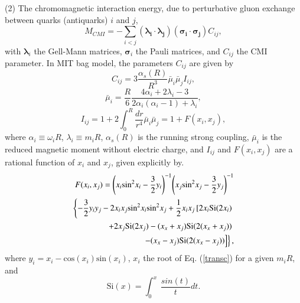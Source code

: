 \documentclass[prd,twocolumn,floatfix,nofootinbib]{revtex4}
\begin{document}
(2) The chromomagnetic interaction energy, due to perturbative gluon
exchange between quarks (antiquarks) $i$ and $j$,
\begin{equation}
M_{CMI}=-\sum_{i<j}\left( \boldsymbol{\lambda _{i}}\cdot \boldsymbol{\lambda
_{j}}\right) \left( \boldsymbol{\sigma _{i}}\cdot \boldsymbol{\sigma _{j}}%
\right) C_{ij},  \label{CMI}
\end{equation}%
with $\boldsymbol{\lambda }_{i}$ the Gell-Mann matrices, $\boldsymbol{\sigma
}_{i}$ the Pauli matrices, and $C_{ij}$ the CMI parameter. In MIT bag model,
the parameters $C_{ij}$ are given by
\begin{equation}
C_{ij}=3\frac{\alpha _{s}\left( R\right) }{R^{3}}\bar{\mu}_{i}\bar{\mu}%
_{j}I_{ij},  \label{Cij}
\end{equation}%
\begin{equation}
\bar{\mu}_{i}=\frac{R}{6}\frac{4\alpha _{i}+2\lambda _{i}-3}{2\alpha
_{i}\left( \alpha _{i}-1\right) +\lambda _{i}},  \label{muBari}
\end{equation}%
\begin{equation}
I_{ij}=1+2\int_{0}^{R}\frac{dr}{r^{4}}\bar{\mu}_{i}\bar{\mu}%
_{j}=1+F(x_{i},x_{j}),  \label{Iij}
\end{equation}%
where $\alpha _{i}\equiv \omega _{i}R$, $\lambda _{i}\equiv m_{i}R$, $\alpha
_{s}\left( R\right) $ is the running strong coupling, $\bar{\mu}_{i}$ is the
reduced magnetic moment without electric charge, and $I_{ij}$ and $%
F(x_{i},x_{j})$ are a rational function of $x_{i}$ and $x_{j}$, given
explicitly by\cite{DeGrand:1975cf}.
\begin{equation}
\begin{aligned} F(x_{i}, x_{j})={\left(x_{i} {\rm
sin}^{2}x_{i}-\frac{3}{2}y_{i}\right)}^{-1} {\left(x_{j} {\rm
sin^{2}}x_{j}-\frac{3}{2}y_{j}\right)}^{-1} \\
\left\{-\frac{3}{2}y_{i}y_{j}-2x_{i}x_{j} {\rm sin}^{2}x_{i} {\rm
sin}^{2}x_{j} +\frac{1}{2}x_{i}x_{j}\left[2x_{i} {\rm Si}(2x_{i})
\right.\right.\\ \left.\left. +2x_{j} {\rm Si}(2x_{j}) -(x_{x}+x_{j}) {\rm
Si}(2(x_{x}+x_{j})) \right.\right.\\ \left.\left. -(x_{x}-x_{j}) {\rm
Si}(2(x_{x}-x_{j})) \right] \right\}, \end{aligned}  \label{F}
\end{equation}%
where $y_{i}=x_{i}-\mathrm{cos}(x_{i})\mathrm{sin}(x_{i})$, $x_{i}$ the root
of Eq. (\ref{transc}) for a given $m_{i}R$, and
\begin{equation}
\mathrm{Si}(x)=\int_{0}^{x}\ \frac{sin(t)}{t}dt.
\end{equation}
\end{document}

